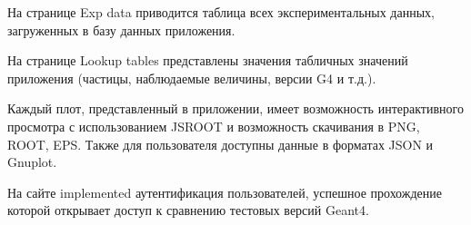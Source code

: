 На странице Exp data приводится таблица всех экспериментальных данных, загруженных в базу данных приложения.

На странице Lookup tables представлены значения табличных значений приложения (частицы, наблюдаемые величины, версии G4 и т.д.).

Каждый плот, представленный в приложении, имеет возможность интерактивного просмотра с использованием JSROOT\cite{JSROOT} и возможность скачивания в PNG, ROOT, EPS. Также для пользователя доступны данные в форматах JSON и Gnuplot. 

На сайте implemented аутентификация пользователей, успешное прохождение которой открывает доступ к сравнению тестовых версий Geant4.





